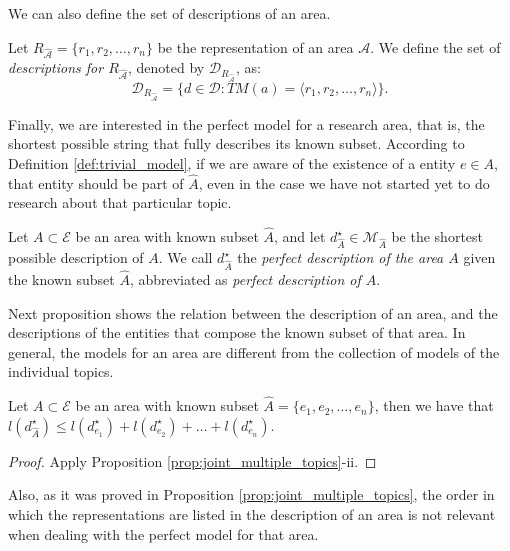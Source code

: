 We can also define the set of descriptions of an area.

\begin{definition}
Let $R_{\hat{\mathcal{A}}} = \{ r_1, r_2, \ldots, r_n \}$ be the representation of an area $\mathcal{A}$. We define the set of \emph{descriptions for $R_{\hat{\mathcal{A}}}$}, denoted by $\mathcal{D}_{R_{\hat{\mathcal{A}}}}$, as:
\[
\mathcal{D}_{R_{\hat{\mathcal{A}}}} = \{ d \in \mathcal{D} : TM(a) = \langle r_1, r_2, \ldots, r_n\rangle \}.
\]
\end{definition}

Finally, we are interested in the perfect model for a research area, that is, the shortest possible string that fully describes its known subset. According to Definition \ref{def:trivial_model}, if we are aware of the existence of a entity $e \in A$, that entity should be part of $\hat{A}$, even in the case we have not started yet to do research about that particular topic.

\begin{definition}
Let $A \subset \mathcal{E}$ be an area with known subset $\hat{A}$, and let $d_{\hat{A}}^{\star} \in \mathcal{M}_{\hat{A}}$ be the shortest possible description of $A$. We call  $d_{\hat{A}}^{\star}$ the \emph{perfect description of the area $A$} given the known subset $\hat{A}$, abbreviated as \emph{perfect description of $A$}.
\end{definition}

Next proposition shows the relation between the description of an area, and the descriptions of the entities that compose the known subset of that area. In general, the models for an area are different from the collection of models of the individual topics.

\begin{proposition}
Let $A \subset \mathcal{E}$ be an area with known subset $\hat{A} = \{e_1, e_2, \ldots, e_n\}$, then we have that $l \left( d_{\hat{A}}^{\star} \right) \leq l(d_ {e_1}^\star) + l(d_ {e_2}^\star) + \ldots + l(d_ {e_n}^\star)$.
\end{proposition}
\begin{proof}
Apply Proposition \ref{prop:joint_multiple_topics}-ii. 
\end{proof}

Also, as it was proved in Proposition \ref{prop:joint_multiple_topics}, the order in which the representations are listed in the description of an area is not relevant when dealing with the perfect model for that area.

